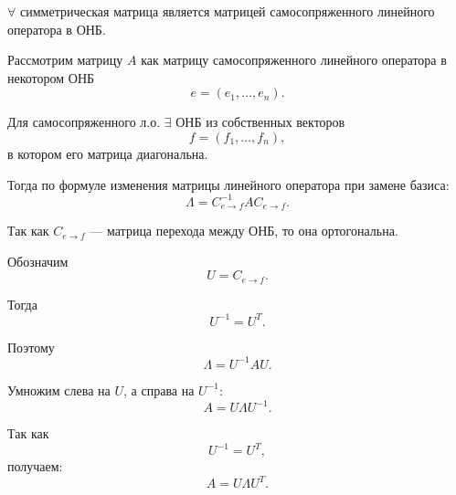 \begin{Proof}
    $\forall$ симметрическая матрица является матрицей самосопряженного линейного оператора в ОНБ.
    
    Рассмотрим матрицу $A$ как матрицу самосопряженного линейного оператора в некотором ОНБ
    \[
        e = (e_1,\ldots,e_n).
    \]
    
    Для самосопряженного л.о. $\exists$ ОНБ из собственных векторов
    \[
        f = (f_1,\ldots,f_n),
    \]
    в котором его матрица диагональна.
    
    Тогда по формуле изменения матрицы линейного оператора при замене базиса:
    \[
        \Lambda = C_{e \to f}^{-1} A C_{e \to f}.
    \]
    
    Так как $C_{e \to f}$ --- матрица перехода между ОНБ, то она ортогональна.
    
    Обозначим
    \[
        U = C_{e \to f}.
    \]
    
    Тогда
    \[
        U^{-1} = U^T.
    \]
    
    Поэтому
    \[
        \Lambda = U^{-1}AU.
    \]
    
    Умножим слева на $U$, а справа на $U^{-1}$:
    \[
        A = U\Lambda U^{-1}.
    \]
    
    Так как
    \[
        U^{-1} = U^T,
    \]
    получаем:
    \[
        A = U\Lambda U^T.
    \]
\end{Proof}
